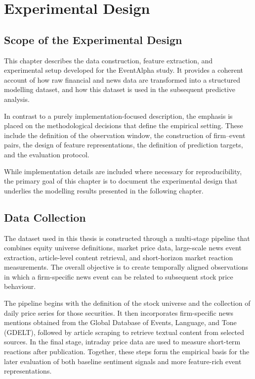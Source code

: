 
\chapter{Experimental Design}

\section{Scope of the Experimental Design}

This chapter describes the data construction, feature extraction, and experimental setup developed for the EventAlpha study. It provides a coherent account of how raw financial and news data are transformed into a structured modelling dataset, and how this dataset is used in the subsequent predictive analysis.

In contrast to a purely implementation-focused description, the emphasis is placed on the methodological decisions that define the empirical setting. These include the definition of the observation window, the construction of firm–event pairs, the design of feature representations, the definition of prediction targets, and the evaluation protocol.

While implementation details are included where necessary for reproducibility, the primary goal of this chapter is to document the experimental design that underlies the modelling results presented in the following chapter.

\section{Data Collection}

The dataset used in this thesis is constructed through a multi-stage pipeline that combines equity universe definitions, market price data, large-scale news event extraction, article-level content retrieval, and short-horizon market reaction measurements. The overall objective is to create temporally aligned observations in which a firm-specific news event can be related to subsequent stock price behaviour.

The pipeline begins with the definition of the stock universe and the collection of daily price series for those securities. It then incorporates firm-specific news mentions obtained from the Global Database of Events, Language, and Tone (GDELT), followed by article scraping to retrieve textual content from selected sources. In the final stage, intraday price data are used to measure short-term reactions after publication. Together, these steps form the empirical basis for the later evaluation of both baseline sentiment signals and more feature-rich event representations.

